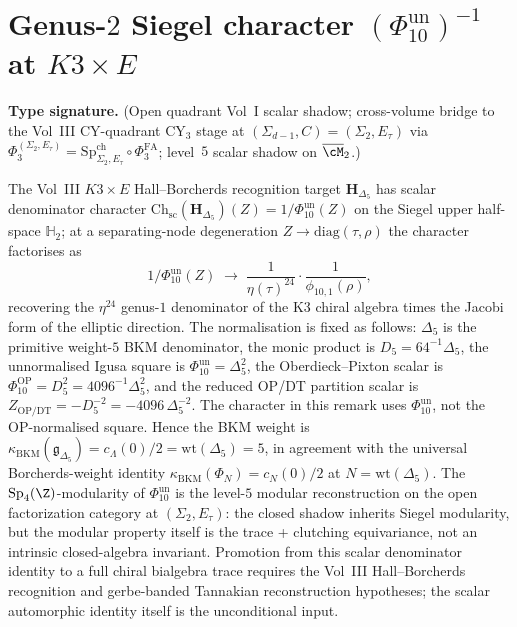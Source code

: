 \section{Genus-$2$ Siegel character $(\Phi_{10}^{\mathrm{un}})^{-1}$ at $K3 \times E$}
\label{sec:genus-complete-supplement}

\begin{remark}
\label{rem:genus-complete-character}
\textbf{Type signature.} (Open quadrant Vol~I scalar shadow;
cross-volume bridge to the Vol~III CY-quadrant CY$_3$ stage at
$(\Sigma_{d-1}, C)=(\Sigma_2, E_\tau)$ via
$\Phi_3^{(\Sigma_2,E_\tau)}=\mathrm{Sp}^{\mathrm{ch}}_{\Sigma_2,E_\tau}\circ
\Phi_3^{\mathrm{FA}}$; level~$5$ scalar shadow on
$\overline{\cM}_2$.)

The Vol~III $K3 \times E$ Hall--Borcherds recognition target
$\mathbf H_{\Delta_5}$ has scalar denominator character
$\mathrm{Ch}_{\mathrm{sc}}(\mathbf{H}_{\Delta_5})(Z) =
1/\Phi_{10}^{\mathrm{un}}(Z)$ on the Siegel upper half-space
$\mathbb{H}_2$; at a separating-node degeneration $Z \to \mathrm{diag}(\tau, \rho)$ the
character factorises as
\[
 1/\Phi_{10}^{\mathrm{un}}(Z) \;\longrightarrow\; \frac{1}{\eta(\tau)^{24}} \cdot \frac{1}{\phi_{10,1}(\rho)},
\]
recovering the $\eta^{24}$ genus-$1$ denominator of the K3 chiral algebra times the
Jacobi form of the elliptic direction. The normalisation is fixed as follows:
$\Delta_5$ is the primitive weight-$5$ BKM denominator, the monic product is
$D_5=64^{-1}\Delta_5$, the unnormalised Igusa square is
$\Phi_{10}^{\mathrm{un}}=\Delta_5^2$, the Oberdieck--Pixton scalar is
$\Phi_{10}^{\mathrm{OP}}=D_5^2=4096^{-1}\Delta_5^2$, and the reduced
OP/DT partition scalar is
$Z_{\mathrm{OP/DT}}=-D_5^{-2}=-4096\,\Delta_5^{-2}$. The character in this
remark uses $\Phi_{10}^{\mathrm{un}}$, not the OP-normalised square. Hence the
BKM weight is
$\kappa_{\mathrm{BKM}}(\mathfrak{g}_{\Delta_5}) = c_\Lambda(0)/2 =
\mathrm{wt}(\Delta_5) = 5$, in agreement with the universal
Borcherds-weight identity
$\kappa_{\mathrm{BKM}}(\Phi_N) = c_N(0)/2$ at $N=\mathrm{wt}(\Delta_5)$.
The $\mathrm{Sp}_4(\Z)$-modularity of $\Phi_{10}^{\mathrm{un}}$ is the
level-$5$ modular reconstruction on the open factorization category at
$(\Sigma_2,E_\tau)$: the closed shadow inherits Siegel modularity, but
the modular property itself is the trace + clutching equivariance, not
an intrinsic closed-algebra invariant. Promotion from this scalar
denominator identity to a full chiral bialgebra trace requires the
Vol~III Hall--Borcherds recognition and gerbe-banded Tannakian
reconstruction hypotheses; the scalar automorphic identity itself is
the unconditional input.
\end{remark}

